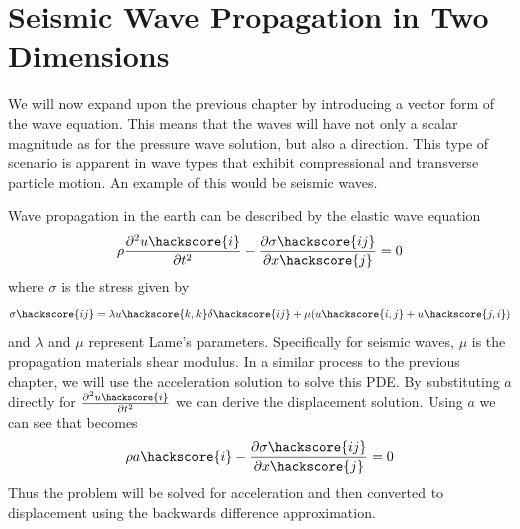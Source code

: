 
%
%
%

\section{Seismic Wave Propagation in Two Dimensions}

We will now expand upon the previous chapter by introducing a vector form of
the wave equation. This means that the waves will have not only a scalar
magnitude as for the pressure wave solution, but also a direction. This type of
scenario is apparent in wave types that exhibit compressional and transverse
particle motion. An example of this would be seismic waves.

Wave propagation in the earth can be described by the elastic wave equation
\begin{equation} \label{eqn:wav} \index{wave equation}
\rho \frac{\partial^{2}u\hackscore{i}}{\partial t^2} - \frac{\partial
\sigma\hackscore{ij}}{\partial x\hackscore{j}} = 0
\end{equation}
where $\sigma$ is the stress given by
\begin{equation} \label{eqn:sigw}
 \sigma \hackscore{ij} = \lambda u\hackscore{k,k} \delta\hackscore{ij} + \mu (
u\hackscore{i,j} + u\hackscore{j,i})
\end{equation}
and $\lambda$ and $\mu$ represent Lame's parameters. Specifically for seismic
waves, $\mu$ is the propagation materials shear modulus. 
In a similar process to the previous chapter, we will use the acceleration
solution to solve this PDE. By substituting $a$ directly for
$\frac{\partial^{2}u\hackscore{i}}{\partial t^2}$ we can derive the
displacement solution. Using $a$ we can see that  becomes
\begin{equation} \label{eqn:wava} 
\rho a\hackscore{i} - \frac{\partial
\sigma\hackscore{ij}}{\partial x\hackscore{j}} = 0
\end{equation}
Thus the problem will be solved for acceleration and then converted to 
displacement using the backwards difference approximation.

